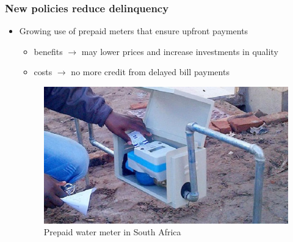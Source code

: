 \documentclass[aspectratio=149]{beamer}
\begin{document}
\begin{frame}
\frametitle{ New policies reduce delinquency }


\begin{itemize}
  \item Growing use of prepaid meters that ensure upfront payments
  \vspace{.1cm}
  \begin{itemize}
    \item benefits $\rightarrow$ may lower prices and increase investments in quality
    \item costs $\rightarrow$ no more credit from delayed bill payments
  \end{itemize}
\begin{figure}
\centering
\caption{Prepaid water meter in South Africa}
\includegraphics[scale=.2]{prepaid-water-meter.jpg}
\end{figure}
\end{itemize}




\end{frame}

\end{document}
